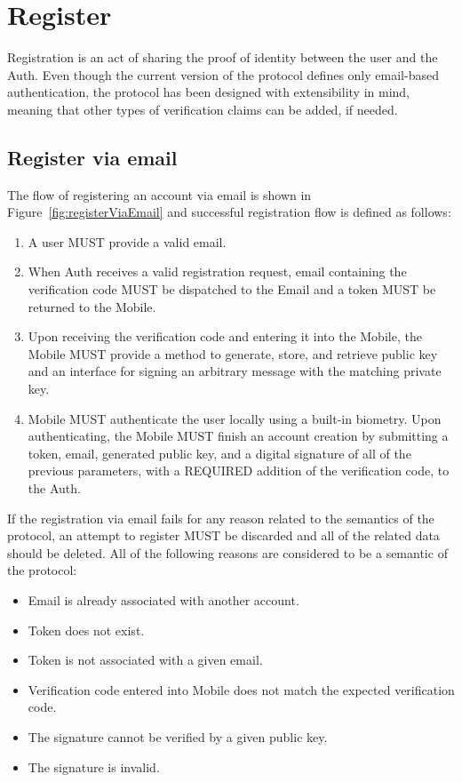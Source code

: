 \section{Register}
Registration is an act of sharing the proof of identity between the user and the Auth. Even though the current 
version of the protocol defines only email-based authentication, the protocol has been designed with 
extensibility in mind, meaning that other types of verification claims can be added, if needed.

      \subsection{Register via email}
      The flow of registering an account via email is shown in Figure~\ref{fig:registerViaEmail} and successful 
      registration flow is defined as follows:
      \begin{enumerate}
            \item A user MUST provide a valid email.
            \item When Auth receives a valid registration request, email containing the verification code MUST 
                  be dispatched to the Email and a token MUST be returned to the Mobile.
            \item Upon receiving the verification code and entering it into the Mobile, the Mobile MUST provide 
                  a method to generate, store, and retrieve public key and an interface for signing an arbitrary 
                  message with the matching private key.
            \item Mobile MUST authenticate the user locally using a built-in biometry. Upon authenticating, 
                  the Mobile MUST finish an account creation by submitting a token, email, generated public key, 
                  and a digital signature of all of the previous parameters, with a REQUIRED addition of the 
                  verification code, to the Auth.
      \end{enumerate}
             
      If the registration via email fails for any reason related to the semantics of the protocol, an attempt to
      register MUST be discarded and all of the related data should be deleted. All of the following reasons are 
      considered to be a semantic of the protocol:
      \begin{itemize}
            \item Email is already associated with another account.
            \item Token does not exist.
            \item Token is not associated with a given email.
            \item Verification code entered into Mobile does not match the expected verification code.
            \item The signature cannot be verified by a given public key.
            \item The signature is invalid.
      \end{itemize}
